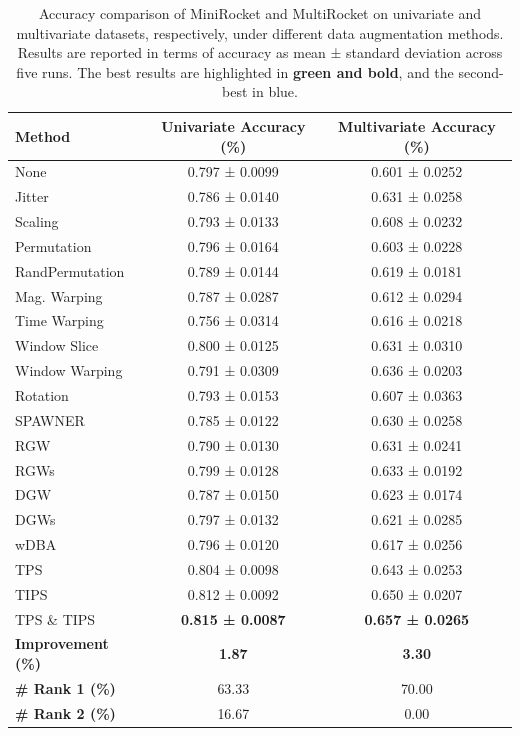 \begin{table}[h!]
\centering
\footnotesize
\vspace{0.2cm}
\renewcommand{\arraystretch}{1.3}
\begin{tabular}{l|c|c}
    \toprule
    \textbf{Method} & \textbf{Univariate Accuracy (\%)} & \textbf{Multivariate Accuracy (\%)} \\
    \midrule
    None            & 0.797 ± 0.0099 & 0.601 ± 0.0252 \\
    Jitter          & 0.786 ± 0.0140 & 0.631 ± 0.0258 \\
    Scaling         & 0.793 ± 0.0133 & 0.608 ± 0.0232 \\
    Permutation     & 0.796 ± 0.0164 & 0.603 ± 0.0228 \\
    RandPermutation & 0.789 ± 0.0144 & 0.619 ± 0.0181 \\
    Mag. Warping     & 0.787 ± 0.0287 & 0.612 ± 0.0294 \\
    Time Warping    & 0.756 ± 0.0314 & 0.616 ± 0.0218 \\
    Window Slice    & \cellcolor{secondcolor}0.800 ± 0.0125 & 0.631 ± 0.0310 \\
    Window Warping  & 0.791 ± 0.0309 & \cellcolor{secondcolor}0.636 ± 0.0203 \\
    Rotation        & 0.793 ± 0.0153 & 0.607 ± 0.0363 \\
    SPAWNER         & 0.785 ± 0.0122 & 0.630 ± 0.0258 \\
    RGW             & 0.790 ± 0.0130 & 0.631 ± 0.0241 \\
    RGWs            & 0.799 ± 0.0128 & 0.633 ± 0.0192 \\
    DGW             & 0.787 ± 0.0150 & 0.623 ± 0.0174 \\
    DGWs            & 0.797 ± 0.0132 & 0.621 ± 0.0285 \\
    wDBA            & 0.796 ± 0.0120 & 0.617 ± 0.0256 \\
    TPS             & 0.804 ± 0.0098 & 0.643 ± 0.0253 \\
    TIPS            & 0.812 ± 0.0092 & 0.650 ± 0.0207 \\
    TPS \& TIPS     & \cellcolor{bestcolor}\textbf{0.815 ± 0.0087} & \cellcolor{bestcolor}\textbf{0.657 ± 0.0265} \\
    \midrule
    \textbf{Improvement (\%)} & \cellcolor{bestcolor}\textbf{1.87} & \cellcolor{bestcolor}\textbf{3.30} \\
    \textbf{\# Rank 1 (\%)}   & 63.33 & 70.00 \\
    \textbf{\# Rank 2 (\%)}   & 16.67 & 0.00 \\
    \bottomrule
\end{tabular}
\vspace{0.2cm}
\caption{Accuracy comparison of MiniRocket and MultiRocket on univariate and multivariate datasets, respectively, under different data augmentation methods. Results are reported in terms of accuracy as mean ± standard deviation across five runs. The best results are highlighted in \textbf{green and bold}, and the second-best in blue.}
\label{tab:tsc_final}
\end{table}

